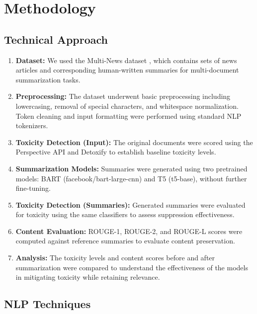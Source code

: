 \documentclass{article}
\begin{document}
\section{Methodology}

\subsection{Technical Approach}

\begin{enumerate}
    \item \textbf{Dataset:} We used the Multi-News dataset \cite{alex2019multinews}, which contains sets of news articles and corresponding human-written summaries for multi-document summarization tasks.

    \item \textbf{Preprocessing:} The dataset underwent basic preprocessing including lowercasing, removal of special characters, and whitespace normalization. Token cleaning and input formatting were performed using standard NLP tokenizers.

    \item \textbf{Toxicity Detection (Input):} The original documents were scored using the Perspective API \cite{perspectiveapi} and Detoxify \cite{Detoxify} to establish baseline toxicity levels.

    \item \textbf{Summarization Models:} Summaries were generated using two pretrained models: BART (facebook/bart-large-cnn) and T5 (t5-base), without further fine-tuning.

    \item \textbf{Toxicity Detection (Summaries):} Generated summaries were evaluated for toxicity using the same classifiers to assess suppression effectiveness.

    \item \textbf{Content Evaluation:} ROUGE-1, ROUGE-2, and ROUGE-L \cite{barbella2022rouge} scores were computed against reference summaries to evaluate content preservation.

    \item \textbf{Analysis:}  The toxicity levels and content scores before and after summarization were compared to understand the effectiveness of the models in mitigating toxicity while retaining relevance.
\end{enumerate}


\subsection{NLP Techniques}
\end{document}
